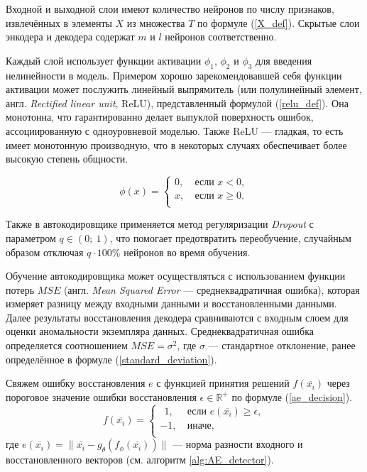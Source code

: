 Входной и выходной слои имеют количество нейронов по числу признаков, извлечённых в элементы $X$ из множества $T$ по формуле (\ref{X_def}). Скрытые слои энкодера и декодера содержат $m$ и $l$ нейронов соответственно.

Каждый слой использует функции активации $\phi_1$, $\phi_2$ и $\phi_3$ для введения нелинейности в модель. Примером хорошо зарекомендовавшей себя функции активации может послужить линейный выпрямитель (или полулинейный элемент, англ. \textit{Rectified linear unit}, ReLU), представленный формулой (\ref{relu_def}). Она монотонна, что гарантированно делает выпуклой поверхность ошибок, ассоциированную с одноуровневой моделью. Также ReLU --- гладкая, то есть имеет монотонную производную, что в некоторых случаях обеспечивает более высокую степень общности.

\begin{equation}\label{relu_def}
    \phi(x) = 
    \begin{cases}
        0, &\ \text{если } x < 0, \\
        x, &\ \text{если } x \ge 0. \\ 
    \end{cases}
\end{equation}

Также в автокодировщике применяется метод регуляризации \textit{Dropout} с параметром $q \in (0;\ 1)$, что помогает предотвратить переобучение, случайным образом отключая $q \cdot 100\%$ нейронов во время обучения. 

Обучение автокодировщика может осуществляться с использованием функции потерь $MSE$ (англ. \textit{Mean Squared Error} --- среднеквадратичная ошибка), которая измеряет разницу между входными данными и восстановленными данными. Далее результаты восстановления декодера сравниваются с входным слоем для оценки аномальности экземпляра данных. Среднеквадратичная ошибка определяется соотношением $MSE = \sigma^2$, где $\sigma$ --- стандартное отклонение, ранее определённое в формуле (\ref{standard_deviation}).

Свяжем ошибку восстановления $e$ с функцией принятия решений $f(\overline{x_i})$ через пороговое значение ошибки восстановления $\epsilon \in \mathbb{R}^+$ по формуле (\ref{ae_decision}).
\begin{equation}\label{ae_decision}
    f(\overline{x_i}) = \begin{cases}
         \ \ 1, &\ \text{если } e(\overline{x_i}) \geq \epsilon, \\
               -1, &\ \text{иначе}, \\ 
         \end{cases}
\end{equation}
где $e(\overline{x_i}) = \lVert \overline{x_i} - g_{\theta}(f_{\phi}(\overline{x_i})) \rVert$ --- норма разности входного и восстановленного векторов (см. алгоритм \ref{alg:AE_detector}).